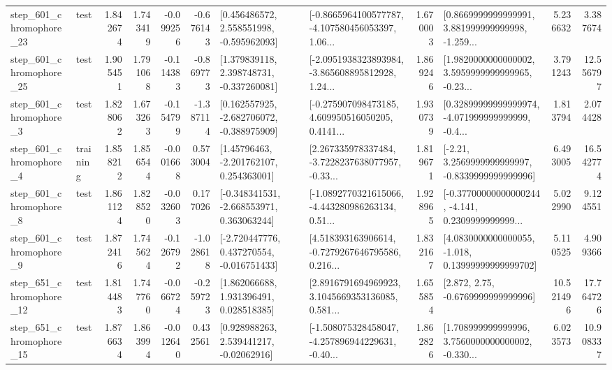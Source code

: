 \begin{tabular}{llrrrrllrlrr}
  step\_601\_chromophore\_23 &      test &      1.842674 &    1.743419 &     -0.099256 & -0.676143 &    [0.456486572, 2.558551998, -0.595962093] &  [-0.8665964100577787, -4.107580456053397, 1.06... &       1.670003 &  [0.8669999999999991, 3.881999999999998, -1.259... &            5.236632 &          3.387674 \\
  step\_601\_chromophore\_25 &      test &      1.905451 &    1.791068 &     -0.114383 & -0.869773 &    [1.379839118, 2.398748731, -0.337260081] &  [-2.0951938323893984, -3.865608895812928, 1.24... &       1.869246 &  [1.9820000000000002, 3.5959999999999965, -0.23... &            3.791243 &         12.556797 \\
   step\_601\_chromophore\_3 &      test &      1.828062 &    1.673263 &     -0.154799 & -1.387114 &   [0.162557925, -2.682706072, -0.388975909] &  [-0.275907098473185, 4.609950516050205, 0.4141... &       1.930739 &  [0.32899999999999974, -4.071999999999999, -0.4... &            1.813794 &          2.074428 \\
   step\_601\_chromophore\_4 &  training &      1.858212 &    1.856544 &     -0.001668 &  0.573004 &     [1.45796463, -2.201762107, 0.254363001] &  [2.267335978337484, -3.7228237638077957, -0.33... &       1.819671 &   [-2.21, 3.2569999999999997, -0.8339999999999996] &            6.493005 &         16.542774 \\
   step\_601\_chromophore\_8 &      test &      1.861124 &    1.828520 &     -0.032603 &  0.177026 &   [-0.348341531, -2.668553971, 0.363063244] &  [-1.0892770321615066, -4.443280986263134, 0.51... &       1.928965 &  [-0.37700000000000244, -4.141, 0.2309999999999... &            5.022990 &          9.124551 \\
   step\_601\_chromophore\_9 &      test &      1.872416 &    1.745624 &     -0.126792 & -1.028618 &   [-2.720447776, 0.437270554, -0.016751433] &  [4.518393163906614, -0.7279267646795586, 0.216... &       1.832167 &  [4.0830000000000055, -1.018, 0.13999999999999702] &            5.110525 &          4.909366 \\
  step\_651\_chromophore\_12 &      test &      1.814483 &    1.747760 &     -0.066724 & -0.259723 &     [1.862066688, 1.931396491, 0.028518385] &  [2.8916791694969923, 3.1045669353136085, 0.581... &       1.655854 &                 [2.872, 2.75, -0.6769999999999996] &           10.521496 &         17.764726 \\
  step\_651\_chromophore\_15 &      test &      1.876634 &    1.863994 &     -0.012640 &  0.432561 &     [0.928988263, 2.539441217, -0.02062916] &  [-1.508075328458047, -4.257896944229631, -0.40... &       1.862826 &  [1.708999999999996, 3.7560000000000002, -0.330... &            6.023573 &         10.908337 \\

\end{tabular}
